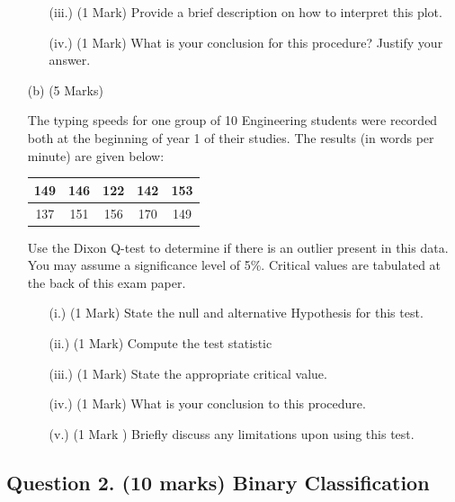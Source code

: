 \documentclass[a4paper,12pt]{article}
\begin{document}
\begin{itemize}
\begin{itemize}
	\item[(iii.)] (1 Mark) Provide a brief description on how to interpret this plot.
	\item[(iv.)] (1 Mark) What is your conclusion for this procedure? Justify your answer.
\end{itemize}

\item[(b)] (5 Marks) 

The typing speeds for one group of 10 Engineering students were recorded both at the beginning of year 1 of their studies. The results (in words per minute) are given below:

\begin{center}
	\begin{tabular}{|c|c|c|c|c|}
		\hline
		149  & 146 & 122 & 142 &  153\\ \hline
		137 & 151 & 156&   170&  149
		\\ \hline
	\end{tabular}
\end{center}
Use the Dixon Q-test to determine if there is an outlier present in this data. You may assume a significance level of 5\%. Critical values are tabulated at the back of this exam paper.
\begin{itemize}
	\item[(i.)](1 Mark)	State the null and alternative Hypothesis for this test.
	\item[(ii.)](1 Mark) Compute the test statistic
	\item[(iii.)](1 Mark) State the appropriate critical value.
	\item[(iv.)](1 Mark) What is your conclusion to this procedure.
	\item[(v.)] (1 Mark ) Briefly discuss any limitations upon using this test.
\end{itemize}
\end{itemize} 


\newpage
\subsection*{Question 2. (10 marks) Binary Classification }
\end{document}
